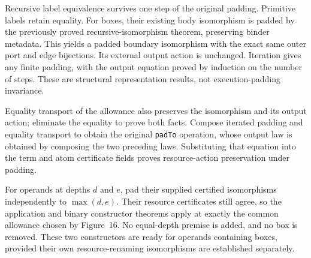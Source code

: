 Recursive label equivalence survives one step of the original padding. Primitive
labels retain equality. For boxes, their existing body isomorphism is padded by
the previously proved recursive-isomorphism theorem, preserving binder metadata.
This yields a padded boundary isomorphism with the exact same outer port and edge
bijections. Its external output action is unchanged. Iteration gives any finite
padding, with the output equation proved by induction on the number of steps.
These are structural representation results, not execution-padding invariance.


Equality transport of the allowance also preserves the isomorphism and
its output action; eliminate the equality to prove both facts. Compose iterated
padding and equality transport to obtain the original \texttt{padTo} operation,
whose output law is obtained by composing the two preceding laws. Substituting
that equation into the term and atom certificate fields proves resource-action
preservation under padding.


For operands at depths $d$ and $e$, pad their supplied certified
isomorphisms independently to $\max(d,e)$. Their resource certificates still
agree, so the application and binary constructor theorems apply at exactly the
common allowance chosen by Figure~16. No equal-depth premise is added, and no
box is removed. These two constructors are ready for operands containing boxes,
provided their own resource-renaming isomorphisms are established separately.


